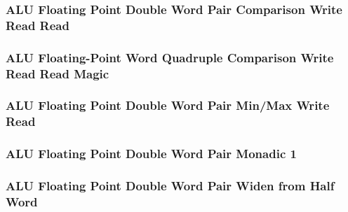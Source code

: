 

\subsubsection[{\small ALU Floating Point Double Word Pair Comparison Write Read Read}]{ALU Floating Point Double Word Pair Comparison Write Read Read} \label{sec:format-ALU-FDPCWRR}



\subsubsection[{\small ALU Floating-Point Word Quadruple Comparison Write Read Read Magic}]{ALU Floating-Point Word Quadruple Comparison Write Read Read Magic} \label{sec:format-ALU-FDPCWRR.M}



\subsubsection[{\small ALU Floating Point Double Word Pair Min/Max Write Read}]{ALU Floating Point Double Word Pair Min/Max Write Read} \label{sec:format-ALU-FDPMMWR}



\subsubsection[{\small ALU Floating Point Double Word Pair Monadic 1}]{ALU Floating Point Double Word Pair Monadic 1} \label{sec:format-ALU-FDPMO1}



\subsubsection[{\small ALU Floating Point Double Word Pair Widen from Half Word}]{ALU Floating Point Double Word Pair Widen from Half Word} \label{sec:format-ALU-FDPWIDEWR}

